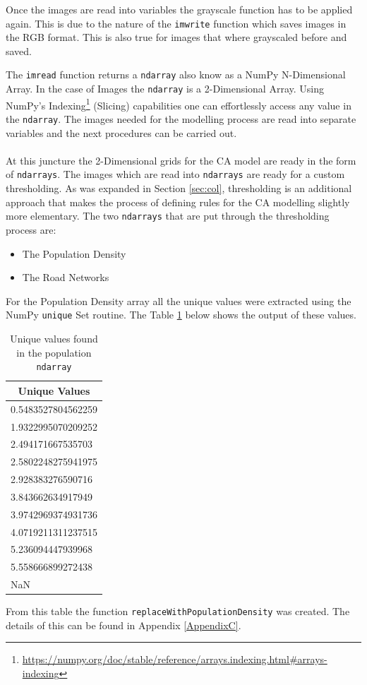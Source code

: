 Once the images are read into variables the grayscale function has to be applied again. This is due to the nature of the \texttt{imwrite} function which saves images in the RGB format. This is also true for images that where grayscaled before and saved.

The \texttt{imread} function returns a \texttt{ndarray} also know as a NumPy N-Dimensional Array. In the case of Images the \texttt{ndarray} is a 2-Dimensional Array. Using NumPy's Indexing\footnote{\url{https://numpy.org/doc/stable/reference/arrays.indexing.html\#arrays-indexing}} (Slicing) capabilities one can effortlessly access any value in the \texttt{ndarray}. The images needed for the modelling process are read into separate variables and the next procedures can be carried out.
\\\\
At this juncture the 2-Dimensional grids for the CA model are ready in the form of \texttt{ndarrays}. The images which are read into \texttt{ndarrays} are ready for a custom thresholding. As was expanded in Section \ref{sec:col}, thresholding is an additional approach that makes the process of defining rules for the CA modelling slightly more elementary. The two \texttt{ndarrays} that are put through the thresholding process are:
\begin{itemize}
\item The Population Density
\item The Road Networks
\end{itemize}
For the Population Density array all the unique values were extracted using the NumPy \texttt{unique} Set routine. The Table \ref{table:uniq} below shows the output of these values.
\begin{table}[H]
\caption{Unique values found in the population \texttt{ndarray}}
\label{table:uniq}
\centering
\begin{tabular}{@{}l@{}}
\toprule
\multicolumn{1}{c}{Unique Values} \\ \midrule
0.5483527804562259                \\
1.9322995070209252                \\
2.494171667535703                 \\
2.5802248275941975                \\
2.928383276590716                 \\
3.843662634917949                 \\
3.9742969374931736                \\
4.0719211311237515                \\
5.236094447939968                 \\
5.558666899272438                 \\
NaN                               \\ \bottomrule
\end{tabular}
\end{table}
From this table the function \texttt{replaceWithPopulationDensity} was created. The details of this can be found in Appendix \ref{AppendixC}.

